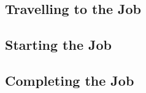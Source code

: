 \subsection{Travelling to the Job}

\subsection{Starting the Job}

\subsection{Completing the Job}





